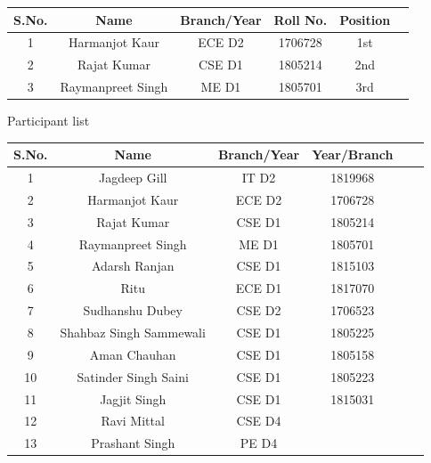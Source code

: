 \documentclass[12pt, a4 paper]{article}
\begin{document}
\begin{table}[h!]
  \begin{center}
    \begin{tabular}{|c|c|c|c|c|c|} 
    \toprule %
      \textbf{S.No.} & \textbf{Name} & \textbf{Branch/Year} & \textbf{Roll No.} &\textbf{Position} \\
      \midrule %
      1 & Harmanjot Kaur 	& ECE D2 & 1706728 & 1st \\
      2	& Rajat Kumar	    & CSE D1 & 1805214 & 2nd \\
      3	& Raymanpreet Singh & ME  D1 & 1805701 & 3rd \\

      \bottomrule %
    \end{tabular}
  \end{center}
\end{table}

\begin{center}
\huge Participant list
\end{center}

\begin{table}[h!]
  \begin{center}
    \begin{tabular}{|c|c|c|c|c|c|} 
    \toprule %
      \textbf{S.No.} & \textbf{Name} & \textbf{Branch/Year } &\textbf{Year/Branch}\\
      \midrule %
      1	 & Jagdeep Gill	           & IT	 D2 & 1819968 \\
      2	 & Harmanjot Kaur	       & ECE D2	& 1706728 \\
      3	 & Rajat Kumar	           & CSE D1	& 1805214 \\
      4	 & Raymanpreet Singh	   & ME	 D1	& 1805701 \\
      5	 & Adarsh Ranjan	       & CSE D1	& 1815103 \\
      6	 & Ritu	                   & ECE D1	& 1817070 \\
      7	 & Sudhanshu Dubey	       & CSE D2	& 1706523 \\
      8	 & Shahbaz Singh Sammewali & CSE D1	& 1805225 \\
      9	 & Aman Chauhan	           & CSE D1	& 1805158 \\
      10 & Satinder Singh Saini	   & CSE D1	& 1805223 \\
      11 & Jagjit Singh	           & CSE D1	& 1815031 \\
      12 & Ravi Mittal	           & CSE D4	&         \\
      13 & Prashant Singh	       & PE	 D4	&         \\

      \bottomrule %
    \end{tabular}
  \end{center}
\end{table}
\end{document}
